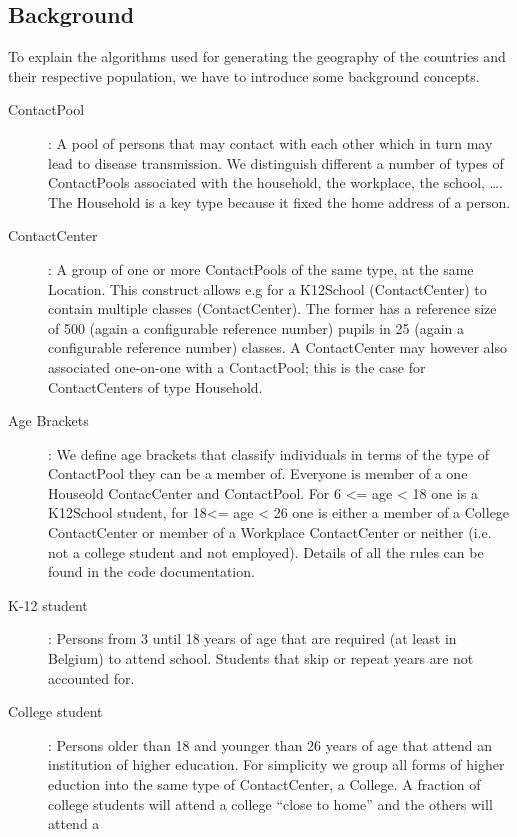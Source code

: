 \subsection{Background}
\label{subsection:background}

To explain the algorithms used for generating the geography of the countries and their respective population, we have to introduce some background concepts. 

\begin{description}
    \item[ContactPool]:
        A pool of persons that may contact with each other which in turn may lead to disease transmission.
        We distinguish different a number of types of ContactPools associated with the household, the workplace, 
        the school, \ldots. The Household is a key type because it fixed the home address of a person.
    \item[ContactCenter]:
        A group of one or more ContactPools of the same type, at the same Location.
        This construct allows e.g for a K12School (ContactCenter) to contain multiple classes (ContactCenter). 
        The former has a reference size of 500 (again a configurable reference number) pupils in 25 
        (again a configurable reference number) classes.
        A ContactCenter may however also associated one-on-one with a ContactPool; this is the case for 
        ContactCenters of type  Household.
\item[Age Brackets]: 
    		We define age brackets that classify individuals in terms of the type of ContactPool they 
    		can be a member of. Everyone is member of a one Houseold ContacCenter and ContactPool. 
    		For  6 <= age < 18 one is a K12School student, for 18<= age < 26 one is either a member of a College
    		ContactCenter or member of a Workplace ContactCenter or neither (i.e. not a college student and not
    		employed). Details of all the rules can be found in the code documentation.
    \item[K-12 student]: 
    		Persons from 3 until 18 years of age that are required (at least in Belgium) to attend school. 
    		Students that skip or repeat years are not accounted for.
    \item[College student]:
        Persons older than 18 and younger than 26 years of age that attend an institution of higher education. 
        For simplicity we group all forms of higher eduction into the same type of ContactCenter, a College. 
        A fraction of college students will attend a college ``close to home'' and the others will attend a 

\end{description}
